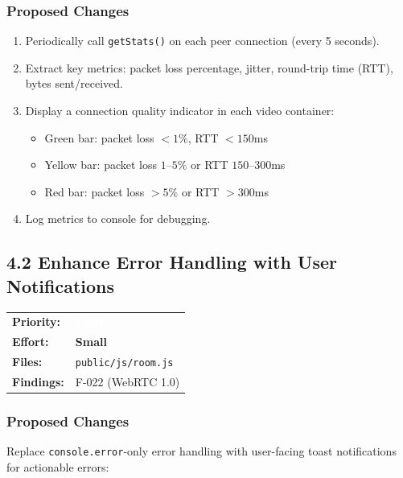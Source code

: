 \documentclass[11pt,letterpaper]{article}
\newcommand{\prilow}{\colorbox{notapplicable}{\textcolor{white}{\small\textbf{LOW}}}}
\newcommand{\effsmall}{\colorbox{compliant!30}{\small\textbf{Small}}}
\begin{document}
\subsubsection{Proposed Changes}

\begin{enumerate}[leftmargin=2em]
    \item Periodically call \texttt{getStats()} on each peer connection (every 5 seconds).
    \item Extract key metrics: packet loss percentage, jitter, round-trip time (RTT), bytes sent/received.
    \item Display a connection quality indicator in each video container:
    \begin{itemize}
        \item Green bar: packet loss $<1\%$, RTT $<150$ms
        \item Yellow bar: packet loss $1$--$5\%$ or RTT $150$--$300$ms
        \item Red bar: packet loss $>5\%$ or RTT $>300$ms
    \end{itemize}
    \item Log metrics to console for debugging.
\end{enumerate}

\subsection{4.2 Enhance Error Handling with User Notifications}

\begin{tabular}{ll}
\textbf{Priority:} & \prilow \\
\textbf{Effort:} & \effsmall \\
\textbf{Files:} & \texttt{public/js/room.js} \\
\textbf{Findings:} & F-022 (WebRTC 1.0) \\
\end{tabular}

\subsubsection{Proposed Changes}

Replace \texttt{console.error}-only error handling with user-facing toast notifications for actionable errors:
\end{document}
